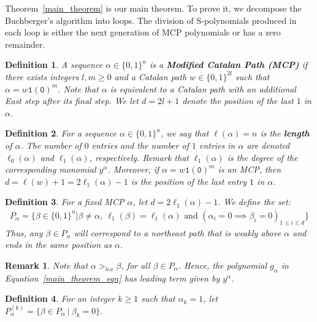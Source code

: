\documentclass[10pt,a4paper]{article}
\newtheorem{definition}{Definition}[section]
\newtheorem{remark}{Remark}[section]
\begin{document}
Theorem~\ref{main_theorem} is our main theorem. To prove it, we decompose the Buchberger's algorithm into loops. The division of S-polynomials produced in each loop is either the next generation of MCP polynomials  or has a zero remainder.
\begin{definition}  \label{MCP}
	A sequence  $\alpha \in \{0,1\}^n$ is a {\bf Modified Catalan Path (MCP)} if there exists integers $l,m\ge 0$ and a Catalan path $w \in \{0,1\}^{2l}$ such that $\alpha = w\texttt{1}(\texttt{0})^m$.
	Note that $\alpha$ is equivalent to a Catalan path with an additional East step after its final step. We let $d=2l+1$ denote the position of the last $1$ in $\alpha$.
\end{definition}
\begin{definition}  \label{pathlength}
	For a sequence $\alpha \in \{0,1\}^n$, we say that $\ell(\alpha)=n$ is the {\bf length} of $\alpha$. The number of  $0$ entries and the number of $1$ entries in $\alpha$ are denoted $	\ell_0(\alpha)$ and $\ell_1(\alpha)$, respectively. Remark that $\ell_1(\alpha)$ is the degree of the corresponding monomial $y^{\alpha}$. Moreover, if $\alpha= w\texttt{1}(\texttt{0})^m$ is an MCP, then 
	$d = \ell(w)+1 =2\ell_1(\alpha)-1$ is the position of the last entry $1$ in $\alpha$.
\end{definition} 
\begin{definition} \label{p_alpha}
	For a fixed MCP $\alpha$, let $d=2\ell_1(\alpha)-1$. We define the set:
	\begin{align*}
		P_{\alpha} = \big\{ \beta \in \{0,1\}^n \big| \beta \neq \alpha,\  \ell_1(\beta)=\ell_1(\alpha) \text{ and } (\alpha_i = 0 \implies \beta_i = 0)_{1 \leq i \leq d}\big\}
	\end{align*}
	Thus, any $\beta \in P_\alpha$ will correspond to a northeast path that is weakly above $\alpha$ and ends in the same position as $\alpha$.
\end{definition}
\begin{remark}\label{rem:lex}
	Note that $\alpha >_{lex} \beta$, for all  $ \beta \in P_{\alpha}$. Hence, the polynomial $g_\alpha$ in Equation~\eqref{main_theorem_eqn} has leading term given by $y^\alpha$.
\end{remark}
\begin{definition} \label{p_alpha_k}
	For an integer $k \geq 1$ such that $\alpha_k=1$, let
		$P_\alpha^{(k)} = \big\{\beta  \in P_\alpha \ | \ \beta_k = 0\big\}.$
\end{definition}
\end{document}
